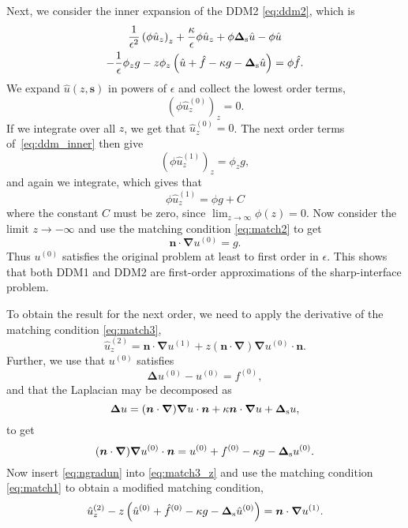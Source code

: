 \documentclass[11pt,b5paper,DIV=calc,BCOR1.3cm,headings=small,%
               footinclude=false,headsepline]{scrbook}
\newcommand*{\vct}[1]{\ensuremath{\boldsymbol{#1}}}
\newcommand*{\del}{\boldsymbol\nabla}
\newcommand*{\grad}{\del}
\newcommand*{\lapl}{\boldsymbol\Delta}
\newcommand*{\lapls}{\boldsymbol\Delta_{\text s}}
\newcommand*{\ndot}{\ensuremath{\vct n\cdot}}
\begin{document}
Next, we consider the inner expansion of the DDM2 \eqref{eq:ddm2}, which is
\begin{multline}
  \frac{1}{\epsilon^2}\left(\phi\hat u_z\right)_z
  + \frac \kappa \epsilon \phi\hat u_z
  + \phi\lapls \hat u
  - \phi\hat u \\
  - \frac 1 \epsilon \phi_z g
  - z\phi_z\left(\hat u + \hat f - \kappa g - \lapls\hat u\right)
  = \phi \hat f.
  \label{eq:ddm_inner}
\end{multline}
We expand $\hat u(z,\vct s)$ in powers of $\epsilon$ and collect the lowest
order terms,
\begin{equation}
  \left(\phi\hat u_z^{(0)}\right)_z = 0.
\end{equation}
If we integrate over all $z$, we get that $\hat u_z^{(0)} = 0$.  The next order
terms of~\eqref{eq:ddm_inner} then give
\begin{equation}
  \left(\phi\hat u_z^{(1)}\right)_z = \phi_z g,
\end{equation}
and again we integrate, which gives that
\begin{equation}
  \phi\hat u_z^{(1)} = \phi g + C
  \label{eq:uz1}
\end{equation}
where the constant $C$ must be zero, since $\lim_{z\to\infty}\phi(z) = 0$.  Now
consider the limit $z\to-\infty$ and use the matching condition
\eqref{eq:match2} to get
\begin{equation}
  \ndot\grad u^{(0)} = g.
\end{equation}
Thus $u^{(0)}$ satisfies the original problem at least to first order in
$\epsilon$.  This shows that both DDM1 and DDM2 are first-order approximations
of the sharp-interface problem.

To obtain the result for the next order, we need to apply the derivative of
the matching condition \eqref{eq:match3},
\begin{equation}
  \hat u_z^{(2)} = \ndot\grad u^{(1)}
      + z (\ndot\grad)\grad u^{(0)}\cdot\vct n.
  \label{eq:match3_z}
\end{equation}
Further, we use that $u^{(0)}$ satisfies
\begin{equation}
  \lapl u^{(0)} - u^{(0)} = f^{(0)},
\end{equation}
and that the Laplacian may be decomposed as
\begin{equation}
  \lapl u = (\ndot\grad)\grad u\cdot\vct n + \kappa\ndot\grad u + \lapls u,
\end{equation}
to get
\begin{equation}
  (\ndot\grad)\grad u^{(0)}\cdot\vct n
    = u^{(0)} + f^{(0)} - \kappa g - \lapls u^{(0)}.
  \label{eq:ngradun}
\end{equation}
Now insert \eqref{eq:ngradun} into \eqref{eq:match3_z} and use the matching
condition \eqref{eq:match1} to obtain a modified matching condition,
\begin{equation}
  \hat u_z^{(2)} - z\left(\hat u^{(0)} + \hat f^{(0)}
        - \kappa g - \lapls \hat u^{(0)}\right)
  = \ndot\grad u^{(1)}.
  \label{eq:match3_z2}
\end{equation}
\end{document}
